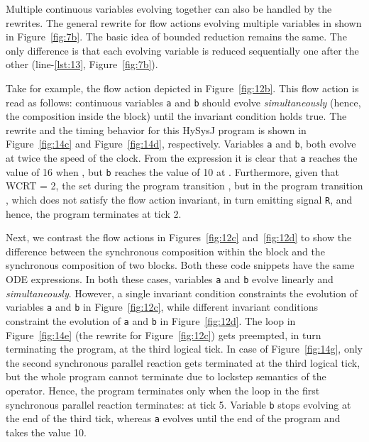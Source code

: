 \documentclass[10pt,journal,cspaper,compsoc]{IEEEtran}
\begin{document}
Multiple continuous variables evolving together can also be handled by
the rewrites. The general rewrite for flow actions evolving multiple
variables in shown in Figure~\ref{fig:7b}. The basic idea of bounded
reduction remains the same. The only difference is that each evolving
variable is reduced sequentially one after the other (line-\ref{lst:13},
Figure~\ref{fig:7b}).

Take for example, the flow action depicted in Figure~\ref{fig:12b}. This
flow action is read as follows: continuous variables \texttt{a} and
\texttt{b} should evolve \textit{simultaneously} (hence, the 
composition inside the  block) until the invariant
condition holds true.  The rewrite and the timing behavior for this
HySysJ program is shown in Figure~\ref{fig:14c} and
Figure~\ref{fig:14d}, respectively. Variables \texttt{a} and \texttt{b},
both evolve at twice the speed of the clock. From the 
expression it is clear that \texttt{a} reaches the value of 16 when
, but \texttt{b} reaches the value of 10 at . Furthermore,
given that WCRT = 2, the set
 during the program
transition , but  in the
program transition , which does not satisfy the flow action
invariant, in turn emitting signal \texttt{R}, and hence, the program
terminates at tick 2.

Next, we contrast the flow actions in Figures~\ref{fig:12c}
and~\ref{fig:12d} to show the difference between the synchronous
composition within the  block and the synchronous
composition of two   blocks. Both these
code snippets have the same ODE expressions. In both these cases,
variables \texttt{a} and \texttt{b} evolve linearly and
\textit{simultaneously}. However, a single invariant condition
constraints the evolution of variables \texttt{a} and \texttt{b} in
Figure~\ref{fig:12c}, while different invariant conditions constraint
the evolution of \texttt{a} and \texttt{b} in Figure~\ref{fig:12d}. The
loop in Figure~\ref{fig:14e} (the rewrite for Figure~\ref{fig:12c}) gets
preempted, in turn terminating the program, at the third logical
tick. In case of Figure~\ref{fig:14g}, only the second synchronous
parallel reaction gets terminated at the third logical tick, but the
whole program cannot terminate due to lockstep semantics of the 
operator. Hence, the program terminates only when the loop in the first
synchronous parallel reaction terminates: at tick 5. Variable \texttt{b}
stops evolving at the end of the third tick, whereas \texttt{a} evolves
until the end of the program and takes the value 10.
\end{document}
